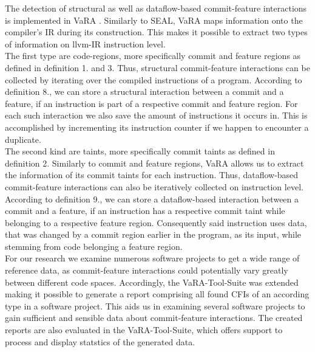 The detection of structural as well as dataflow-based commit-feature interactions is implemented in VaRA \cite{VaRA2023}.
Similarly to SEAL, VaRA maps information onto the compiler's IR during its construction.
This makes it possible to extract two types of information on llvm-IR instruction level. \\
The first type are code-regions, more specifically commit and feature regions as defined in definition 1. and 3.
Thus, structural commit-feature interactions can be collected by iterating over the compiled instructions of a program.
According to definition 8., we can store a structural interaction between a commit and a feature, if an instruction is part of a respective commit and feature region.
For each such interaction we also save the amount of instructions it occurs in. 
This is accomplished by incrementing its instruction counter if we happen to encounter a duplicate. \\
The second kind are taints, more specifically commit taints as defined in definition 2.
Similarly to commit and feature regions, VaRA allows us to extract the information of its commit taints for each instruction.
Thus, dataflow-based commit-feature interactions can also be iteratively collected on instruction level.
According to definition 9., we can store a dataflow-based interaction between a commit and a feature, if an instruction has a respective commit taint while belonging to a respective feature region.
Consequently said instruction uses data, that was changed by a commit region earlier in the program, as its input, while stemming from code belonging a feature region. \\
For our research we examine numerous software projects to get a wide range of reference data, as commit-feature interactions could potentially vary greatly between different code spaces.
Accordingly, the VaRA-Tool-Suite was extended making it possible to generate a report comprising all found CFIs of an according type in a software project.
This aids us in examining several software projects to gain sufficient and sensible data about commit-feature interactions.
The created reports are also evaluated in the VaRA-Tool-Suite, which offers support to process and display statstics of the generated data. \\

